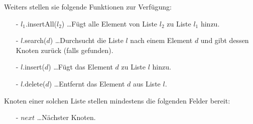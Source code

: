 \documentclass{article}
\begin{document}
\noindent
Weiters stellen sie folgende Funktionen zur Verf{\"u}gung:
\begin{itemize}
  \item[-] $l_1$.insertAll($l_2$) \ldots F{\"u}gt alle Element von Liste $l_2$ zu
    Liste $l_1$ hinzu.
  \item[-] $l$.search($d$) \ldots Durchsucht die Liste $l$ nach einem Element $d$
    und gibt dessen Knoten zur{\"u}ck (falls gefunden).
  \item[-] $l$.insert($d$) \ldots F{\"u}gt das Element $d$ zu Liste $l$ hinzu.
  \item[-] $l$.delete($d$) \ldots Entfernt das Element $d$ aus Liste $l$.
\end{itemize}
%
Knoten einer solchen Liste stellen mindestens die folgenden Felder bereit:
\begin{itemize}
  \item[-] $next$ \ldots N{\"a}chster Knoten.
\end{itemize}
%
\end{document}

